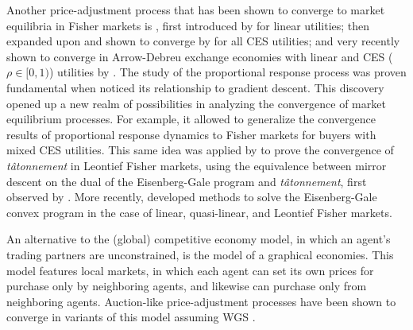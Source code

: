 Another price-adjustment process that has been shown to converge to market equilibria in Fisher markets is , first introduced by \citet{first-prop-response} for linear utilities; then expanded upon and shown to converge by \cite{proportional-response} for all CES utilities; and very recently shown to converge in Arrow-Debreu exchange economies with linear and CES ($\rho \in [0,1)$) utilities by \citeauthor{branzei2021proportional}. 
The study of the proportional response process was proven fundamental when \citeauthor{fisher-tatonnement} noticed its relationship to gradient descent.
This discovery opened up a new realm of possibilities in analyzing the convergence of market equilibrium processes.
For example, it allowed \citet{cheung2018dynamics} to generalize the convergence results of proportional response dynamics to Fisher markets for buyers with mixed CES utilities.
This same idea was applied by \citet{fisher-tatonnement} to prove the convergence of \emph{t\^atonnement\/} in Leontief Fisher markets, using the equivalence between mirror descent \cite{boyd2004convex}
on the dual of the Eisenberg-Gale program 
and \emph{t\^atonnement}, first observed by \citet{devanur2008market}.
More recently, \citet{gao2020first} developed 
methods to solve the Eisenberg-Gale convex program in the case of linear, quasi-linear, and Leontief Fisher markets.

An alternative to the (global) competitive economy model, in which an agent's trading partners are unconstrained, is the \citet{kakade2004graphical} model of a graphical economies.
This model features local markets, in which each agent can set its own prices for purchase only by neighboring agents, and likewise can purchase only from neighboring agents. 
Auction-like price-adjustment processes have been shown to converge in variants of this model assuming WGS \cite{andrade2021graphical}.
